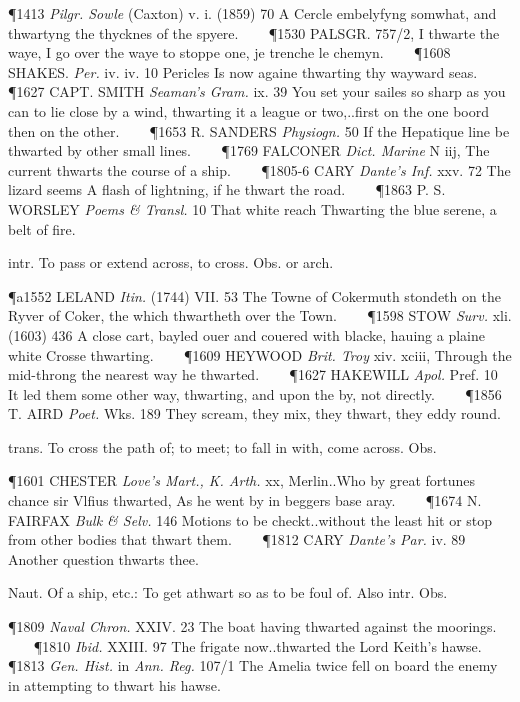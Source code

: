 \begin{description}[wide, labelwidth=!, labelindent=0pt]
\begin{myenumerate}
\P 1413  \textit{Pilgr. Sowle} (Caxton) v. i. (1859) 70 A Cercle embelyfyng somwhat, and thwartyng the thycknes of the spyere.    
\P 1530 PALSGR. 757/2, I thwarte the waye, I go over the waye to stoppe one, je trenche le chemyn.    
\P 1608 SHAKES.  \textit{Per.} iv. iv. 10 Pericles Is now againe thwarting thy wayward seas.    
\P 1627 CAPT. SMITH  \textit{Seaman's Gram.} ix. 39 You set your sailes so sharp as you can to lie close by a wind, thwarting it a league or two,..first on the one boord then on the other.    
\P 1653 R. SANDERS  \textit{Physiogn.} 50 If the Hepatique line be thwarted by other small lines.    
\P 1769 FALCONER  \textit{Dict. Marine} N iij, The current thwarts the course of a ship.    
\P 1805-6 CARY \textit{Dante's Inf.} xxv. 72 The lizard seems A flash of lightning, if he thwart the road.    
\P 1863 P. S. WORSLEY  \textit{Poems \& Transl.} 10 That white reach Thwarting the blue serene, a belt of fire.

 intr. To pass or extend across, to cross. Obs. or arch.

\P a1552 LELAND \textit{Itin.} (1744) VII. 53 The Towne of Cokermuth stondeth on the Ryver of Coker, the which thwartheth over the Town.    
\P 1598 STOW  \textit{Surv.} xli. (1603) 436 A close cart, bayled ouer and couered with blacke, hauing a plaine white Crosse thwarting.    
\P 1609 HEYWOOD  \textit{Brit. Troy} xiv. xciii, Through the mid-throng the nearest way he thwarted.    
\P 1627 HAKEWILL  \textit{Apol.} Pref. 10 It led them some other way, thwarting, and upon the by, not directly.    
\P 1856 T. AIRD  \textit{Poet.} Wks. 189 They scream, they mix, they thwart, they eddy round.

 trans. To cross the path of; to meet; to fall in with, come across. Obs.

\P 1601 CHESTER  \textit{Love's Mart., K. Arth.} xx, Merlin..Who by great fortunes chance sir Vlfius thwarted, As he went by in beggers base aray.    
\P 1674 N. FAIRFAX  \textit{Bulk \& Selv.} 146 Motions to be checkt..without the least hit or stop from other bodies that thwart them.    
\P 1812 CARY  \textit{Dante's Par.} iv. 89 Another question thwarts thee.

 Naut. Of a ship, etc.: To get athwart so as to be foul of. Also intr. Obs.

\P 1809  \textit{Naval Chron.} XXIV. 23 The boat having thwarted against the moorings.    
\P 1810  \textit{Ibid.} XXIII. 97 The frigate now..thwarted the Lord Keith's hawse.    
\P 1813 \textit{Gen. Hist.} in  \textit{Ann. Reg.} 107/1 The Amelia twice fell on board the enemy in attempting to thwart his hawse.


\end{myenumerate}
\end{description}
